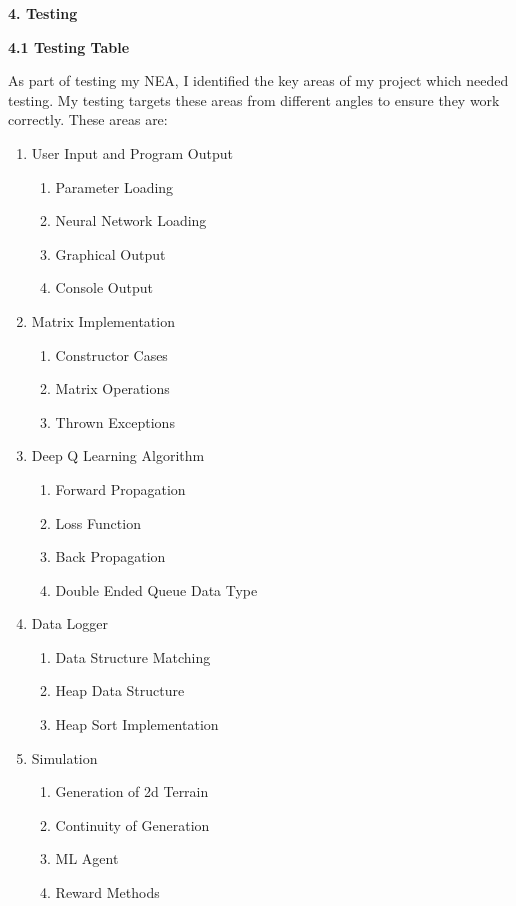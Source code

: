 \begin{flushleft}
    \huge
    \textbf{4. Testing}
    \vspace{0.1cm}
    
    \Large{\textbf{4.1 Testing Table}}
    \vspace{0.5cm}
    
    \large
    As part of testing my NEA, I identified the key areas of my project which needed testing.
    My testing targets these areas from different angles to ensure they work correctly. 
    These areas are:
    \begin{enumerate}
        \item User Input and Program Output
            \begin{enumerate}
                \item Parameter Loading
                \item Neural Network Loading
                \item Graphical Output
                \item Console Output
            \end{enumerate}
        \item Matrix Implementation
            \begin{enumerate}
                \item Constructor Cases
                \item Matrix Operations
                \item Thrown Exceptions
            \end{enumerate}
        \item Deep Q Learning Algorithm
            \begin{enumerate}
                \item Forward Propagation
                \item Loss Function
                \item Back Propagation
                \item Double Ended Queue Data Type
            \end{enumerate}
        \item Data Logger
            \begin{enumerate}
                \item Data Structure Matching
                \item Heap Data Structure
                \item Heap Sort Implementation
            \end{enumerate}
        \item Simulation
            \begin{enumerate}
                \item Generation of 2d Terrain
                \item Continuity of Generation
                \item ML Agent
                \item Reward Methods
            \end{enumerate}
    \end{enumerate}
    

\end{flushleft}
